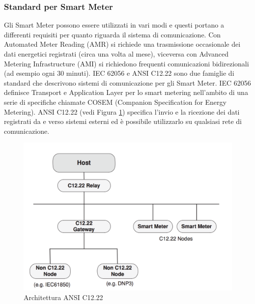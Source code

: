 \subsubsection{Standard per Smart Meter}
Gli Smart Meter possono essere utilizzati in vari modi e questi portano a differenti requisiti per quanto riguarda il sistema di comunicazione. Con Automated Meter Reading (AMR) si richiede una trasmissione occasionale dei dati energetici registrati (circa una volta al mese), viceversa con  Advanced Metering Infrastructure (AMI) si richiedono frequenti comunicazioni bidirezionali (ad esempio ogni 30 minuti). IEC 62056 e ANSI C12.22 sono due famiglie di standard che descrivono sistemi di comunicazione per gli Smart Meter. IEC 62056 definisce Transport e Application Layer per lo smart metering nell'ambito di una serie di specifiche chiamate COSEM (Companion Specification for Energy Metering). ANSI C12.22 (vedi Figura \ref{fig:arch_c1222}) specifica l'invio e la ricezione dei dati registrati da e verso sistemi esterni ed è possibile utilizzarlo su qualsiasi rete di comunicazione.
\begin{figure}[h]
	\centering
	\includegraphics[scale=0.350]{imgs/arch_c1222.png}
	\caption{Architettura ANSI C12.22} \label{fig:arch_c1222}
\end{figure}
\newpage
